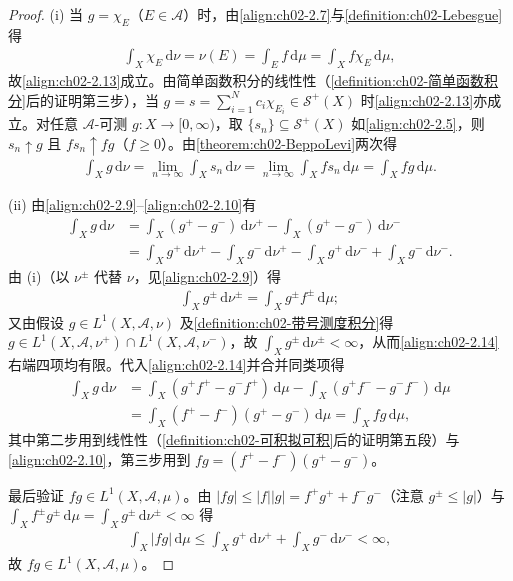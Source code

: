 \documentclass[../../main.tex]{subfiles}%
\begin{document}
\begin{proof}
(i) 当 $g=\chi_E$（$E\in\mathscr A$）时，由\eqref{align:ch02-2.7}与\cref{definition:ch02-Lebesgue}得
\begin{align*}
\int_X\chi_E\,\mathrm{d}\nu=\nu(E)=\int_Ef\,\mathrm{d}\mu=\int_Xf\chi_E\,\mathrm{d}\mu,
\end{align*}
故\eqref{align:ch02-2.13}成立。由简单函数积分的线性性（\cref{definition:ch02-简单函数积分}后的证明第三步），当 $g=s=\sum_{i=1}^Nc_i\chi_{E_i}\in\mathscr S^+(X)$ 时\eqref{align:ch02-2.13}亦成立。对任意 $\mathscr A$-可测 $g:X\to[0,\infty)$，取 $\{s_n\}\subseteq\mathscr S^+(X)$ 如\eqref{align:ch02-2.5}，则 $s_n\uparrow g$ 且 $fs_n\uparrow fg$（$f\geqslant0$）。由\cref{theorem:ch02-BeppoLevi}两次得
\begin{align*}
\int_Xg\,\mathrm{d}\nu=\lim_{n\to\infty}\int_Xs_n\,\mathrm{d}\nu
=\lim_{n\to\infty}\int_Xfs_n\,\mathrm{d}\mu=\int_Xfg\,\mathrm{d}\mu.
\end{align*}

(ii) 由\eqref{align:ch02-2.9}--\eqref{align:ch02-2.10}有
\begin{align}
\int_Xg\,\mathrm{d}\nu
&=\int_X(g^+-g^-)\,\mathrm{d}\nu^+-\int_X(g^+-g^-)\,\mathrm{d}\nu^- \nonumber\\
&=\int_Xg^+\,\mathrm{d}\nu^+-\int_Xg^-\,\mathrm{d}\nu^+-\int_Xg^+\,\mathrm{d}\nu^-+\int_Xg^-\,\mathrm{d}\nu^-. \label{align:ch02-2.14}
\end{align}
由 (i)（以 $\nu^\pm$ 代替 $\nu$，见\eqref{align:ch02-2.9}）得
\begin{align*}
\int_Xg^\pm\,\mathrm{d}\nu^\pm=\int_Xg^\pm f^\pm\,\mathrm{d}\mu;
\end{align*}
又由假设 $g\in L^1(X,\mathscr A,\nu)$ 及\cref{definition:ch02-带号测度积分}得 $g\in L^1(X,\mathscr A,\nu^+)\cap L^1(X,\mathscr A,\nu^-)$，故 $\int_Xg^\pm\,\mathrm{d}\nu^\pm<\infty$，从而\eqref{align:ch02-2.14}右端四项均有限。代入\eqref{align:ch02-2.14}并合并同类项得
\begin{align*}
\int_Xg\,\mathrm{d}\nu
&=\int_X(g^+f^+-g^-f^+)\,\mathrm{d}\mu-\int_X(g^+f^--g^-f^-)\,\mathrm{d}\mu\\
&=\int_X(f^+-f^-)(g^+-g^-)\,\mathrm{d}\mu=\int_Xfg\,\mathrm{d}\mu,
\end{align*}
其中第二步用到线性性（\cref{definition:ch02-可积拟可积}后的证明第五段）与\eqref{align:ch02-2.10}，第三步用到 $fg=(f^+-f^-)(g^+-g^-)$。

最后验证 $fg\in L^1(X,\mathscr A,\mu)$。由 $|fg|\leqslant|f||g|=f^+g^++f^-g^-$（注意 $g^\pm\leqslant|g|$）与 $\int_Xf^\pm g^\pm\,\mathrm{d}\mu=\int_Xg^\pm\,\mathrm{d}\nu^\pm<\infty$ 得
\begin{align*}
\int_X|fg|\,\mathrm{d}\mu\leqslant\int_Xg^+\,\mathrm{d}\nu^++\int_Xg^-\,\mathrm{d}\nu^-<\infty,
\end{align*}
故 $fg\in L^1(X,\mathscr A,\mu)$。
\end{proof}
\end{document}
